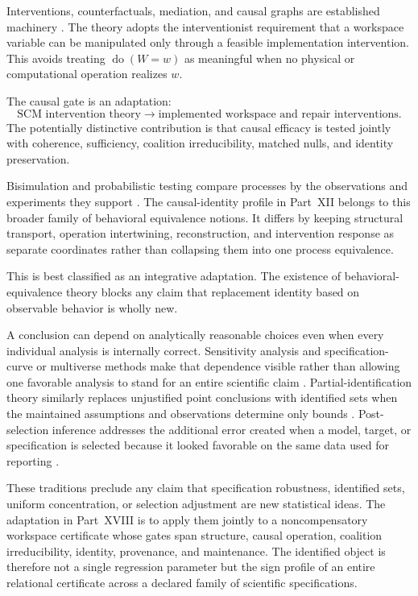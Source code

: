
Interventions, counterfactuals, mediation, and causal graphs are established
machinery \cite{Pearl2009}. The theory adopts the interventionist
requirement that a workspace variable can be manipulated only through a
feasible implementation intervention. This avoids treating
\(\operatorname{do}(W=w)\) as meaningful when no physical or computational
operation realizes \(w\).

The causal gate is an adaptation:
\[
\text{SCM intervention theory}
\longrightarrow
\text{implemented workspace and repair interventions}.
\]
The potentially distinctive contribution is that causal efficacy is tested
jointly with coherence, sufficiency, coalition irreducibility, matched nulls,
and identity preservation.


Bisimulation and probabilistic testing compare processes by the observations
and experiments they support \cite{LarsenSkou1991}. The causal-identity profile
in Part~XII belongs to this broader family of behavioral equivalence notions.
It differs by keeping structural transport, operation intertwining,
reconstruction, and intervention response as separate coordinates rather than
collapsing them into one process equivalence.

This is best classified as an integrative adaptation. The existence of
behavioral-equivalence theory blocks any claim that replacement identity based
on observable behavior is wholly new.


A conclusion can depend on analytically reasonable choices even when every
individual analysis is internally correct. Sensitivity analysis and
specification-curve or multiverse methods make that dependence visible rather
than allowing one favorable analysis to stand for an entire scientific claim
\cite{Leamer1983,SteegenEtAl2016,SimonsohnEtAl2020}. Partial-identification
theory similarly replaces unjustified point conclusions with identified sets
when the maintained assumptions and observations determine only bounds
\cite{Manski2003,ImbensManski2004}. Post-selection inference addresses the
additional error created when a model, target, or specification is selected
because it looked favorable on the same data used for reporting
\cite{BerkEtAl2013}.

These traditions preclude any claim that specification robustness, identified
sets, uniform concentration, or selection adjustment are new statistical
ideas. The adaptation in Part~XVIII is to apply them jointly to a
noncompensatory workspace certificate whose gates span structure, causal
operation, coalition irreducibility, identity, provenance, and maintenance.
The identified object is therefore not a single regression parameter but the
sign profile of an entire relational certificate across a declared family of
scientific specifications.


